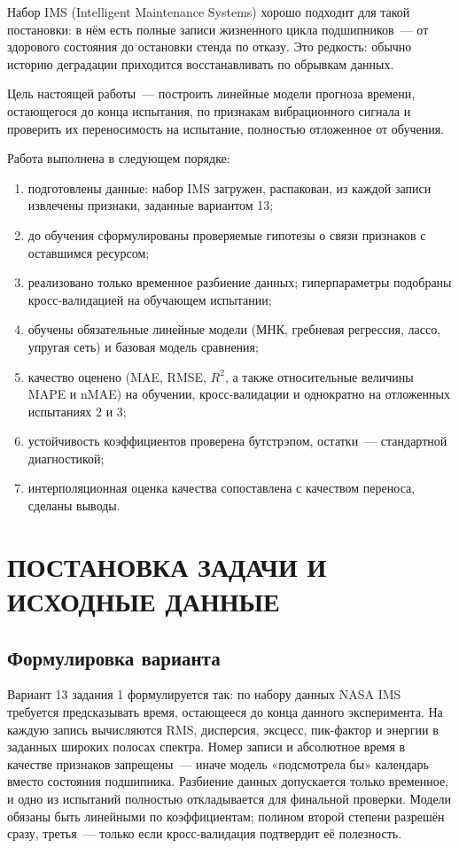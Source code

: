 \documentclass[14pt,a4paper]{extarticle}
\begin{document}
Набор IMS (Intelligent Maintenance Systems) хорошо подходит для такой
постановки: в нём есть полные записи жизненного цикла подшипников~--- от
здорового состояния до остановки стенда по отказу. Это редкость: обычно
историю деградации приходится восстанавливать по обрывкам данных.

Цель настоящей работы~--- построить линейные модели прогноза времени,
остающегося до конца испытания, по признакам вибрационного сигнала
и проверить их переносимость на испытание, полностью отложенное от обучения.

Работа выполнена в следующем порядке:
\begin{enumerate}
  \item подготовлены данные: набор IMS загружен, распакован, из каждой записи
  извлечены признаки, заданные вариантом 13;
  \item до обучения сформулированы проверяемые гипотезы о связи признаков
  с оставшимся ресурсом;
  \item реализовано только временное разбиение данных; гиперпараметры
  подобраны кросс-валидацией на обучающем испытании;
  \item обучены обязательные линейные модели (МНК, гребневая регрессия,
  лассо, упругая сеть) и базовая модель сравнения;
  \item качество оценено (MAE, RMSE, $R^2$, а также относительные
  величины MAPE и nMAE) на обучении, кросс-валидации и однократно
  на отложенных испытаниях 2 и 3;
  \item устойчивость коэффициентов проверена бутстрэпом, остатки~---
  стандартной диагностикой;
  \item интерполяционная оценка качества сопоставлена с качеством переноса,
  сделаны выводы.
\end{enumerate}

\section{ПОСТАНОВКА ЗАДАЧИ И ИСХОДНЫЕ ДАННЫЕ}

\subsection{Формулировка варианта}

Вариант 13 задания 1 формулируется так: по набору данных NASA IMS требуется
предсказывать время, остающееся до конца данного эксперимента. На каждую
запись вычисляются RMS, дисперсия, эксцесс, пик-фактор и энергии в заданных
широких полосах спектра. Номер записи и абсолютное время в качестве признаков
запрещены~--- иначе модель «подсмотрела бы» календарь вместо состояния
подшипника. Разбиение данных допускается только временное, и одно из
испытаний полностью откладывается для финальной проверки. Модели обязаны
быть линейными по коэффициентам; полином второй степени разрешён сразу,
третья~--- только если кросс-валидация подтвердит её полезность.
\end{document}
